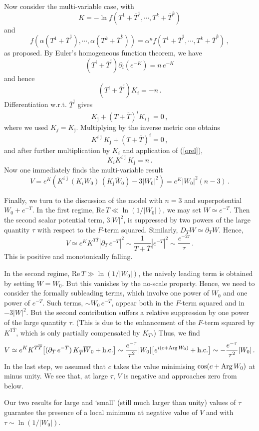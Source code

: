 \documentclass[12pt]{article}
\newcommand{\be}{\begin{equation}}
\newcommand{\ee}{\end{equation}}
\newcommand{\ol}{\overline}
\numberwithin{equation}{section}
\begin{document}
Now consider the multi-variable case, with 
\be
K=-\ln f(T^1+\ol{T}^1,\cdots,T^k+\ol{T}^k)
\ee
and
\be
f(\alpha(T^1+\ol{T}^1),\cdots,\alpha(T^k+\ol{T}^k))=\alpha^n f(T^1+\ol{T}^1,\cdots,T^k+\ol{T}^k)\,,
\ee
as proposed. By Euler's homogeneous function theorem, we have
\be
(T^i+\ol{T}^{\ol{\imath}})\partial_i(e^{-K})=n\,e^{-K}
\ee
and hence
\be
(T^i+\ol{T}^{\ol{\imath}})K_i=-n\,.\label{orel}
\ee
Differentiation w.r.t. $\ol{T}^{\ol{\jmath}}$ gives
\be
K_{\ol{\jmath}}+(T+\ol{T})^i K_{i\ol{\jmath}}=0\,,
\ee
where we used $K_j=K_{\ol{\jmath}}$. Multiplying by the inverse metric one obtains
\be
K^{i\ol{\jmath}}K_{\ol{\jmath}}+(T+\ol{T})^i=0\,, \label{kud}
\ee
and after further multiplication by $K_i$ and application of (\ref{orel}), 
\be
K_i K^{i\ol{\jmath}}K_{\ol{\jmath}} = n\,. \label{nsr}
\ee
Now one immediately finds the multi-variable result
\be
V=e^K(K^{i\ol{\jmath}} (K_i W_0)\,(K_{\ol{\jmath}}\ol{W}_0)-3|W_0|^2)=
e^K|W_0|^2(n-3)\,.
\ee

Finally, we turn to the discussion of the model with $n=3$ and superpotential $W_0+e^{-T}$. In the first regime, Re$\,T\ll \ln(1/|W_0|)$, we may set $W\simeq e^{-T}$. Then the second scalar potential term, $3|W|^2$, is suppressed by two powers of the large quantity $\tau$ with respect to the $F$-term squared. Similarly, $D_TW\simeq \partial_TW$. Hence,
\be
V\simeq e^K K^{T\ol{T}}|\partial_T\,e^{-T}|^2\sim \frac{1}{T+\ol{T}}|e^{-T}|^2
\sim \frac{e^{-2\tau}}{\tau}\,.
\ee
This is positive and monotonically falling.

In the second regime, Re$\,T\gg \ln(1/|W_0|)$, the naively leading term is obtained by setting $W=W_0$. But this vanishes by the no-scale property. Hence, we need to consider the formally subleading terms, which involve one power of $W_0$ and one power of $e^{-T}$. Such terms, $\sim W_0\,e^{-T}$, appear both in the $F$-term squared and in $-3|W|^2$. But the second contribution suffers a relative suppression by one power of the large quantity $\tau$. (This is due to the enhancement of the $F$-term squared by $K^{T\ol{T}}$, which is only partially compensated by $K_T$.) Thus, we find
\be
V\simeq e^K K^{T\ol{T}}\big[(\partial_T\,e^{-T})\,K_{\ol{T}}\ol{W}_0+\mbox{h.c.}\big]
\sim \frac{e^{-\tau}}{\tau^2}|W_0|\big[e^{i(c+{\rm Arg}\,W_0)}+\mbox{h.c.} \big]\sim 
-\frac{e^{-\tau}}{\tau^2}|W_0|\,.
\ee
In the last step, we assumed that $c$ takes the value minimising $\cos(c+{\rm Arg}\,W_0)$ at minus unity. We see that, at large $\tau$, $V$ is negative and approaches zero from below.

Our two results for large and `small' (still much larger than unity) values of $\tau$ guarantee the presence of a local minimum at negative value of $V$ and with $\tau\sim \ln(1/|W_0|)$. 
\end{document}
